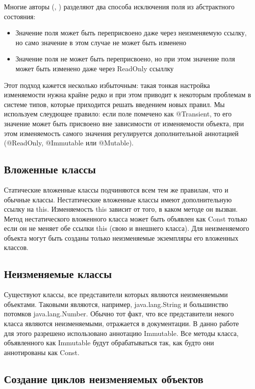 Многие авторы (\cite{Zibin2007}, \cite{Tschantz2006}) разделяют два способа исключения поля из абстрактного состояния:
\begin{itemize}
\item{Значение поля может быть переприсвоено даже через неизменяемую ссылку, но само значение в этом случае не может быть изменено}
\item{Значение поля не может быть переприсвоено, но при этом значение поля может быть изменено даже через ReadOnly ссыллку}
\end{itemize}
Этот подход кажется несколько избыточным: такая тонкая настройка изменяемости нужна крайне редко и при этом приводит к некоторым проблемам в системе типов, которые приходится решать введением новых правил. Мы используем слеудющее правило: если поле помечено как @Transient, то его значение может быть присвоено вне зависимости от изменяемости объекта, при этом изменяемость самого значения регулируется дополнительной аннотацией (@ReadOnly, @Immutable или @Mutable).

\subsection{Вложенные классы}

Статические вложенные классы подчиняются всем тем же правилам, что и обычные классы. Нестатические вложенные классы имеют дополнительную ссылку на this. Изменяемость this зависит от того, в каком методе он вызван. Метод нестатического вложенного класса может быть объявлен как Const только если он не меняет обе ссылки this (свою и внешнего класса). Для неизменяемого объекта могут быть созданы только неизменяемые экземпляры его вложенных классов. 

\subsection{Неизменяемые классы}

Существуют классы, все представители которых являются неизменяемыми объектами. Таковыми являются, например, java.lang.String и большинство потомков java.lang.Number. Обычно тот факт, что все представители некого класса являются неизменяемыми, отражается в документации. В данно работе для этого разрешено использовано аннотацию Immutable. Все методы класса, объявленного как Immutable будут обрабатываться так, как будто они аннотированы как Const.

\subsection{Создание циклов неизменяемых объектов}

